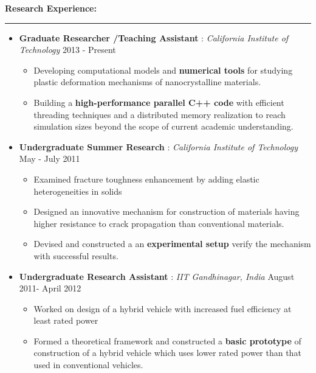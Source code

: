 \documentclass[10pt,fleqn]{article}
\begin{document}
\vspace{-5pt}
\textbf{Research Experience:}
\vspace{-25pt}
\begin{center}
\rule{\textwidth}{.4pt}
\end{center}
\vspace{-15pt}
\begin{itemize}
\setlength{\itemsep}{8pt}
\setlength{\parskip}{0pt}
\setlength{\itemindent}{-5mm}
\item[] \textbf{Graduate Researcher /Teaching Assistant }: \emph{California Institute of Technology} \hfill 2013 - Present
		  \begin{itemize}
		  \item Developing computational models and \textbf{numerical tools} for studying plastic deformation mechanisms of nanocrystalline materials.
		  \item Building a \textbf{high-performance parallel C++ code} with efficient threading techniques and a distributed memory realization to reach simulation sizes beyond the scope of current academic understanding.
 		  \end{itemize}
\item[] \textbf{Undergraduate Summer Research} : \emph{California Institute of Technology} \hfill May - July 2011
		   \begin{itemize}
		   \item Examined fracture toughness enhancement by adding elastic heterogeneities in solids  
			\item Designed an innovative mechanism for construction of materials having higher resistance to crack propagation than conventional materials.
			\item Devised and constructed a an \textbf{experimental setup} verify the mechanism with successful results.
 			\end{itemize}
\item[] \textbf{Undergraduate Research Assistant} : \emph{IIT Gandhinagar, India} \hfill August 2011- April 2012	
		   \begin{itemize}
		   \item Worked on design of a hybrid vehicle with increased fuel efficiency at least rated power
			\item Formed a theoretical framework and constructed a \textbf{basic prototype} of construction of a hybrid vehicle which uses lower rated power than that used in conventional vehicles.
 			\end{itemize} 
\end{itemize}
\end{document}
